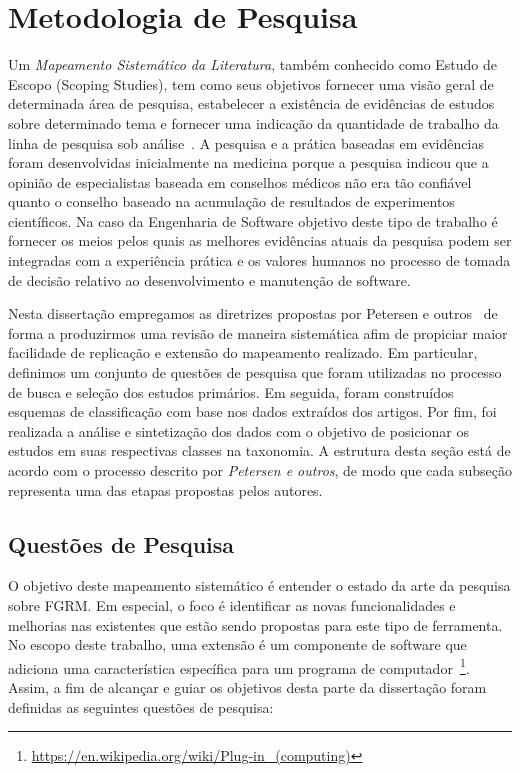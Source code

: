 \section{Metodologia de Pesquisa}
\label{sec:map-metodologia}

Um \textit{Mapeamento Sistemático da Literatura}, também conhecido como Estudo
de Escopo (Scoping Studies), tem como seus objetivos fornecer uma visão geral de
determinada área de pesquisa, estabelecer a existência de evidências de estudos
sobre determinado tema e fornecer uma indicação da quantidade de trabalho da
linha de pesquisa sob
análise~\cite{keele2007guidelines,wohlin2012experimentation}. A pesquisa e a
prática baseadas em evidências foram desenvolvidas inicialmente na medicina
porque a pesquisa indicou que a opinião de especialistas baseada em conselhos
médicos não era tão confiável quanto o conselho baseado na acumulação de
resultados de experimentos científicos. Na caso da Engenharia de Software
objetivo deste tipo de trabalho é fornecer os meios pelos quais as melhores
evidências atuais da pesquisa podem ser integradas com a experiência prática e
os valores humanos no processo de tomada de decisão relativo ao desenvolvimento
e manutenção de software.

Nesta dissertação empregamos as diretrizes propostas por Petersen e
outros~\cite{Petersen2008} de forma a produzirmos uma revisão de maneira
sistemática afim de propiciar maior facilidade de replicação e extensão do
mapeamento realizado. Em particular, definimos um conjunto de questões de
pesquisa que foram utilizadas no processo de busca e seleção dos estudos
primários. Em seguida, foram construídos esquemas de classificação com base nos
dados extraídos dos artigos. Por fim, foi realizada a análise e sintetização dos
dados com o objetivo de posicionar os estudos em suas respectivas classes na
taxonomia. A estrutura desta seção está de acordo com o processo descrito por
\textit{Petersen e outros}, de modo que cada subseção representa uma das etapas
propostas pelos autores.

\subsection{Questões de Pesquisa}
\label{subsec:map-questoes-de-pesquisa}

O objetivo deste mapeamento sistemático é entender o estado da arte da pesquisa
sobre FGRM\@. Em especial, o foco é identificar as novas funcionalidades e
melhorias nas existentes que estão sendo propostas para este tipo de ferramenta.
No escopo deste trabalho, uma extensão é um componente de software que adiciona
uma característica específica para um programa de
computador~\footnote{\url{https://en.wikipedia.org/wiki/Plug-in_(computing)}}.
Assim, a fim de alcançar e guiar os objetivos desta parte da dissertação foram
definidas as seguintes questões de pesquisa:

